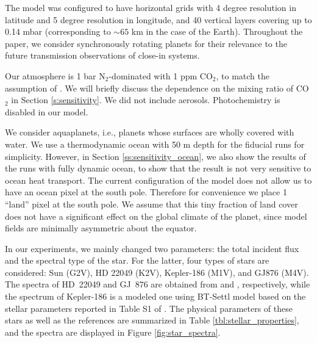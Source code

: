 \documentclass[11pt,numberedappendix,twocolappendix,]{emulateapj}
\begin{document}
The model was configured to have horizontal grids with 4 degree resolution in latitude and 5 degree resolution in longitude, and 40 vertical layers covering up to 0.14 mbar (corresponding to $\sim 65$ km in the case of the Earth). 
Throughout the paper, we consider synchronously rotating planets for their  relevance to the future transmission observations of close-in systems. 

Our atmosphere is 1 bar N$_2$-dominated with 1 ppm CO$_2$, to match the assumption of \citet{Kopparapu2016}. 
We will briefly discuss the dependence on the mixing ratio of CO$_2$ in Section \ref{s:sensitivity}. 
We did not include aerosols. 
Photochemistry is disabled in our model. 

We consider aquaplanets, i.e., planets whose surfaces are wholly covered with water. 
We use a thermodynamic ocean with 50 m depth for the fiducial runs for simplicity. 
However, in Section \ref{ss:sensitivity_ocean}, we also show the results of the runs with fully dynamic ocean, to show that the result is not very sensitive to ocean heat transport. 
The current configuration of the model does not allow us to have an ocean pixel at the south pole. Therefore for convenience we place 1 ``land'' pixel at the south pole. We assume that this tiny fraction of land cover does not have a significant effect on the global climate of the planet, since model fields are minimally asymmetric about the equator. 



In our experiments, we mainly changed two parameters: the total incident flux and the spectral type of the star. 
For the latter, four types of stars are considered: 
Sun (G2V), 
HD 22049 (K2V), 
Kepler-186 (M1V), and 
GJ876 (M4V). 
The spectra of HD~22049 and GJ~876 are obtained from \citet{Segura2003} and \citet{Domagal-Goldman2014}, respectively, 
while the spectrum of Kepler-186 is a modeled one using BT-Settl model \citep{Allard2012} based on the stellar parameters reported in Table S1 of \citet{Quintana2014}. 
The physical parameters of these stars as well as the references are summarized in Table \ref{tbl:stellar_properties}, and the spectra are displayed in Figure \ref{fig:star_spectra}. 
\end{document}
